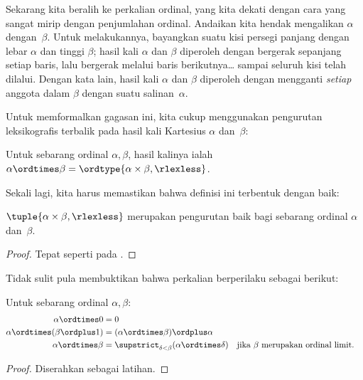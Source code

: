\documentclass[../../../include/open-logic-section]{subfiles}
\begin{document}


Sekarang kita beralih ke perkalian ordinal, yang kita dekati dengan cara yang
sangat mirip dengan penjumlahan ordinal. Andaikan kita hendak mengalikan
$\alpha$ dengan~$\beta$. Untuk melakukannya, bayangkan suatu kisi persegi
panjang dengan lebar $\alpha$ dan tinggi $\beta$; hasil kali $\alpha$ dan
$\beta$ diperoleh dengan bergerak sepanjang setiap baris, lalu bergerak
melalui baris berikutnya\ldots{} sampai seluruh kisi telah dilalui. Dengan
kata lain, hasil kali $\alpha$ dan $\beta$ diperoleh dengan mengganti
\emph{setiap} anggota dalam $\beta$ dengan suatu salinan~$\alpha$.

Untuk memformalkan gagasan ini, kita cukup menggunakan pengurutan
leksikografis terbalik pada hasil kali Kartesius $\alpha$ dan~$\beta$:

\begin{defn}
Untuk sebarang ordinal $\alpha, \beta$, hasil kalinya ialah
$\alpha \ordtimes \beta = \ordtype{\alpha \times \beta, \rlexless}$.
\end{defn}
\noindent
Sekali lagi, kita harus memastikan bahwa definisi ini terbentuk dengan baik:

\begin{lem}
$\tuple{\alpha \times \beta, \rlexless}$ merupakan pengurutan baik bagi
sebarang ordinal $\alpha$ dan~$\beta$.
\end{lem}

\begin{proof}
Tepat seperti pada .
\end{proof}
\noindent
Tidak sulit pula membuktikan bahwa perkalian berperilaku sebagai berikut:

\begin{lem}
Untuk sebarang ordinal $\alpha, \beta$:
\begin{align*}
	\alpha \ordtimes 0 &= 0\\
	\alpha \ordtimes (\beta \ordplus 1) &=
		(\alpha \ordtimes \beta) \ordplus \alpha\\
	\alpha  \ordtimes \beta &=
		\supstrict_{\delta < \beta}(\alpha \ordtimes \delta) &&
		\text{jika $\beta$ merupakan ordinal limit}.
\end{align*}
\end{lem}

\begin{proof}
Diserahkan sebagai latihan.
\end{proof}
\end{document}
